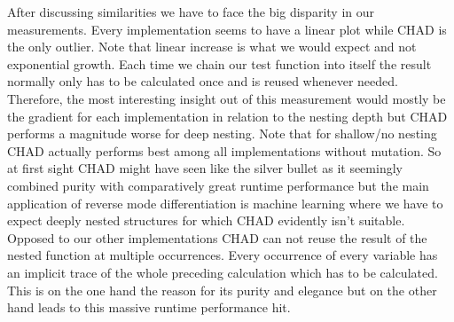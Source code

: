 After discussing similarities we have to face the big disparity in our measurements. Every implementation seems to have a linear plot while CHAD is the only outlier. Note that linear increase is what we would expect and not exponential growth. Each time we chain our test function into itself the result normally only has to be calculated once and is reused whenever needed. Therefore, the most interesting insight out of this measurement would mostly be the gradient for each implementation in relation to the nesting depth but CHAD performs a magnitude worse for deep nesting. Note that for shallow/no nesting CHAD actually performs best among all implementations without mutation. So at first sight CHAD might have seen like the silver bullet as it seemingly combined purity with comparatively great runtime performance but the main application of reverse mode differentiation is machine learning where we have to expect deeply nested structures for which CHAD evidently isn't suitable. Opposed to our other implementations CHAD can not reuse the result of the nested function at multiple occurrences. Every occurrence of every variable has an implicit trace of the whole preceding calculation which has to be calculated. This is on the one hand the reason for its purity and elegance but on the other hand leads to this massive runtime performance hit.

